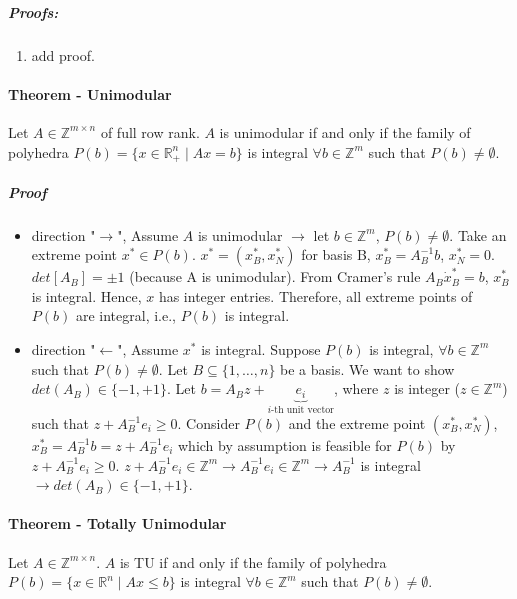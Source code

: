 \documentclass[main]{subfiles}
\begin{document}
\subparagraph{Proofs:}
\begin{enumerate}
\item add proof.
\end{enumerate}

\paragraph{Theorem - Unimodular}
Let $A \in \mathbb{Z}^{m \times n}$ of full row rank. $A$ is unimodular if and
only if the family of polyhedra $P(b) = \{ x \in \mathbb{R}^{n}_+ \mid Ax = b
\}$ is integral $\forall b \in \mathbb{Z}^{m}$ such that $P(b) \neq \emptyset$.

\subparagraph{Proof}
\begin{itemize}
\item direction "$\rightarrow$", Assume $A$ is unimodular $\rightarrow$ let $b
\in \mathbb{Z}^{m}$, $P(b) \neq \emptyset$. Take an extreme point $x^{*} \in
P(b)$. $x^{*} = (x^{*}_{B}, x^{*}_{N})$ for basis B, $x^{*}_{B} = A^{-1}_{B}b$,
$x^{*}_{N} = 0$.\\
$det[A_{B}] = \pm 1$ (because A is unimodular). From Cramer's rule $A_{B} \dot
x^{*}_{B} = b$, $x^{*}_{B}$ is integral. Hence, $x$ has integer entries.
Therefore, all extreme points of $P(b)$ are integral, i.e., $P(b)$ is integral.

\item direction "$\leftarrow$", Assume $x^{*}$ is integral. Suppose $P(b)$ is
integral, $\forall b \in \mathbb{Z}^{m}$ such that $P(b) \neq \emptyset$. Let
$B \subseteq \{1, \dots, n\}$ be a basis. We want to show $det(A_{B}) \in \{-1,
+1\}$.
Let $b = A_{B}z + \underbrace{e_{i}}_{\text{$i$-th unit vector}}$, where $z$ is
integer ($z \in \mathbb{Z}^{m}$) such that $z + A^{-1}_{B} e_{i} \geq 0$.
Consider $P(b)$ and the extreme point $(x^{*}_{B}, x^{*}_{N})$, $x^{*}_{B} =
A^{-1}_{B}b = z + A^{-1}_{B} e_{i}$ which by assumption is feasible for $P(b)$
by $z + A^{-1}_{B} e_{i} \geq 0$. $z + A^{-1}_{B} e_{i} \in \mathbb{Z}^{m}
\rightarrow A^{-1}_{B} e_{i} \in \mathbb{Z}^{m} \rightarrow A^{-1}_{B}$ is
integral $\rightarrow det(A_{B}) \in \{-1, +1\}$.
\end{itemize}

\paragraph{Theorem - Totally Unimodular}
Let $A \in \mathbb{Z}^{m \times n}$. $A$ is TU if and only if the family of
polyhedra $P(b) = \{ x \in \mathbb{R}^{n} \mid Ax \leq b \}$ is integral
$\forall b \in \mathbb{Z}^{m}$ such that $P(b) \neq \emptyset$.
\end{document}
